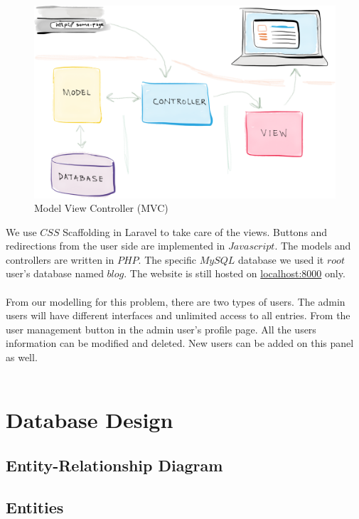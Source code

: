 \begin{figure}[h]
      \centering
	\includegraphics[scale=0.2]{MVC_framework.png}
      \caption{Model View Controller (MVC)}
\end{figure}

We use $CSS$ Scaffolding in Laravel to take care of the views. Buttons and redirections from the user side are implemented in $Javascript$. The models and controllers are written in $PHP$. The specific $MySQL$ database we used it $root$ user's database named $blog$. The website is still hosted on \url{localhost:8000} only.\\
\\
From our modelling for this problem, there are two types of users. The admin users will have different interfaces and unlimited access to all entries. From the user management button in the admin user's profile page. All the users information can be modified and deleted. New users can be added on this panel as well.\\
\\

\newpage

\section{Database Design}

\subsection{Entity-Relationship Diagram}
\newpage

\subsection{Entities}

